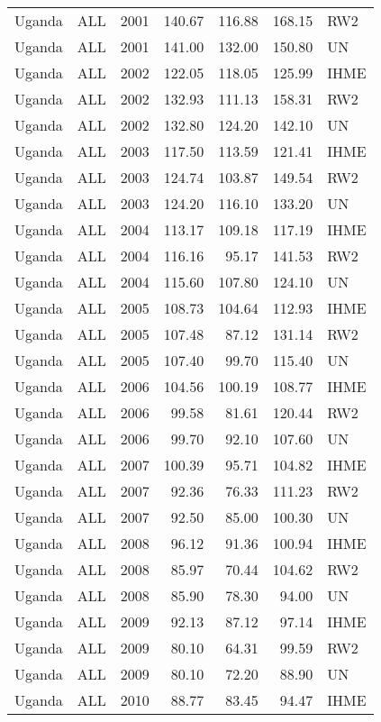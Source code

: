 \begin{longtable}{lllrrrl}
  Uganda & ALL & 2001 & 140.67 & 116.88 & 168.15 & RW2 \\ 
  Uganda & ALL & 2001 & 141.00 & 132.00 & 150.80 & UN \\ 
  Uganda & ALL & 2002 & 122.05 & 118.05 & 125.99 & IHME \\ 
  Uganda & ALL & 2002 & 132.93 & 111.13 & 158.31 & RW2 \\ 
  Uganda & ALL & 2002 & 132.80 & 124.20 & 142.10 & UN \\ 
  Uganda & ALL & 2003 & 117.50 & 113.59 & 121.41 & IHME \\ 
  Uganda & ALL & 2003 & 124.74 & 103.87 & 149.54 & RW2 \\ 
  Uganda & ALL & 2003 & 124.20 & 116.10 & 133.20 & UN \\ 
  Uganda & ALL & 2004 & 113.17 & 109.18 & 117.19 & IHME \\ 
  Uganda & ALL & 2004 & 116.16 & 95.17 & 141.53 & RW2 \\ 
  Uganda & ALL & 2004 & 115.60 & 107.80 & 124.10 & UN \\ 
  Uganda & ALL & 2005 & 108.73 & 104.64 & 112.93 & IHME \\ 
  Uganda & ALL & 2005 & 107.48 & 87.12 & 131.14 & RW2 \\ 
  Uganda & ALL & 2005 & 107.40 & 99.70 & 115.40 & UN \\ 
  Uganda & ALL & 2006 & 104.56 & 100.19 & 108.77 & IHME \\ 
  Uganda & ALL & 2006 & 99.58 & 81.61 & 120.44 & RW2 \\ 
  Uganda & ALL & 2006 & 99.70 & 92.10 & 107.60 & UN \\ 
  Uganda & ALL & 2007 & 100.39 & 95.71 & 104.82 & IHME \\ 
  Uganda & ALL & 2007 & 92.36 & 76.33 & 111.23 & RW2 \\ 
  Uganda & ALL & 2007 & 92.50 & 85.00 & 100.30 & UN \\ 
  Uganda & ALL & 2008 & 96.12 & 91.36 & 100.94 & IHME \\ 
  Uganda & ALL & 2008 & 85.97 & 70.44 & 104.62 & RW2 \\ 
  Uganda & ALL & 2008 & 85.90 & 78.30 & 94.00 & UN \\ 
  Uganda & ALL & 2009 & 92.13 & 87.12 & 97.14 & IHME \\ 
  Uganda & ALL & 2009 & 80.10 & 64.31 & 99.59 & RW2 \\ 
  Uganda & ALL & 2009 & 80.10 & 72.20 & 88.90 & UN \\ 
  Uganda & ALL & 2010 & 88.77 & 83.45 & 94.47 & IHME \\ 

\end{longtable}
